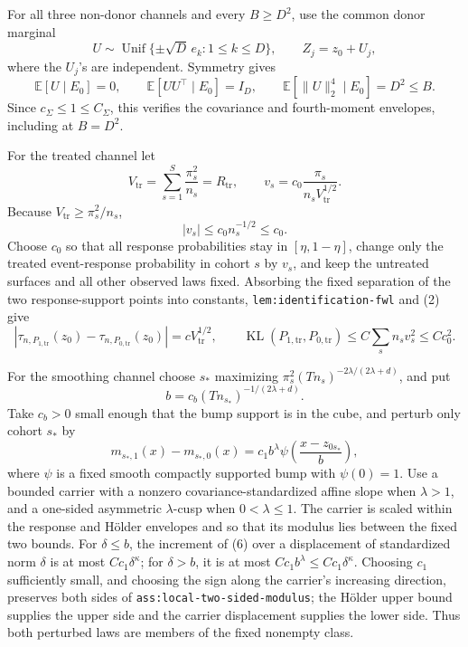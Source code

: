 For all three non-donor channels and every \(B\geq D^2\), use the common donor marginal
\[
U\sim\operatorname{Unif}\{\pm\sqrt D\,e_k:1\leq k\leq D\},
\qquad Z_j=z_0+U_j,
\]
where the \(U_j\)'s are independent.  Symmetry gives
\[
\mathbb E[U\mid E_0]=0,
\qquad
\mathbb E[UU^\top\mid E_0]=I_D,
\qquad
\mathbb E[\|U\|_2^4\mid E_0]=D^2\leq B.
\tag{4}
\]
Since \(c_\Sigma\leq1\leq C_\Sigma\), this verifies the covariance and fourth-moment envelopes, including at \(B=D^2\).

For the treated channel let
\[
V_{\mathrm{tr}}=\sum_{s=1}^{S}\frac{\pi_s^2}{n_s}=R_{\mathrm{tr}},
\qquad
v_s=c_0\frac{\pi_s}{n_sV_{\mathrm{tr}}^{1/2}}.
\]
Because \(V_{\mathrm{tr}}\geq\pi_s^2/n_s\),
\[
|v_s|\leq c_0n_s^{-1/2}\leq c_0.
\]
Choose \(c_0\) so that all response probabilities stay in \([\eta,1-\eta]\), change only the treated event-response probability in cohort \(s\) by \(v_s\), and keep the untreated surfaces and all other observed laws fixed.  Absorbing the fixed separation of the two response-support points into constants, \texttt{lem:identification-fwl} and (2) give
\[
\left|\tau_{n,P_{1,\mathrm{tr}}}(z_0)-
\tau_{n,P_{0,\mathrm{tr}}}(z_0)\right|
=cV_{\mathrm{tr}}^{1/2},
\qquad
\operatorname{KL}(P_{1,\mathrm{tr}},P_{0,\mathrm{tr}})
\leq C\sum_s n_sv_s^2\leq Cc_0^2.
\tag{5}
\]

For the smoothing channel choose \(s_*\) maximizing
\(\pi_s^2(Tn_s)^{-2\lambda/(2\lambda+d)}\), and put
\[
b=c_b(Tn_{s_*})^{-1/(2\lambda+d)}.
\]
Take \(c_b>0\) small enough that the bump support is in the cube, and perturb only cohort \(s_*\) by
\[
m_{s_*,1}(x)-m_{s_*,0}(x)
=c_1b^\lambda\psi\!\left(\frac{x-z_{0s_*}}b\right),
\tag{6}
\]
where \(\psi\) is a fixed smooth compactly supported bump with \(\psi(0)=1\).  Use a bounded carrier with a nonzero covariance-standardized affine slope when \(\lambda>1\), and a one-sided asymmetric \(\lambda\)-cusp when \(0<\lambda\leq1\).  The carrier is scaled within the response and H\"older envelopes and so that its modulus lies between the fixed two bounds.  For \(\delta\leq b\), the increment of (6) over a displacement of standardized norm \(\delta\) is at most \(Cc_1\delta^\kappa\); for \(\delta>b\), it is at most \(Cc_1b^\lambda\leq Cc_1\delta^\kappa\).  Choosing \(c_1\) sufficiently small, and choosing the sign along the carrier's increasing direction, preserves both sides of \texttt{ass:local-two-sided-modulus}; the H\"older upper bound supplies the upper side and the carrier displacement supplies the lower side.  Thus both perturbed laws are members of the fixed nonempty class.

